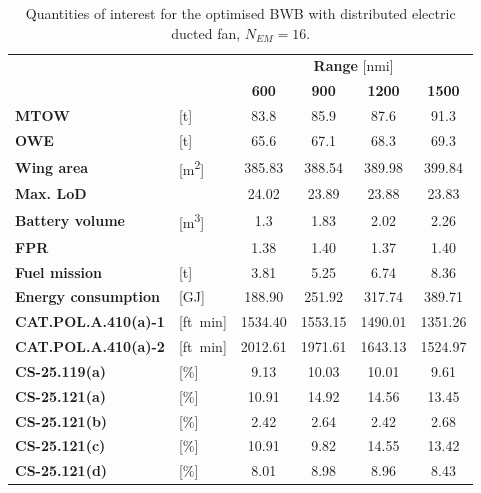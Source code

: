 \begin{table}[!h]
	\centering
	\begin{tabular}{l l c c c c}
		\cline{3-6}
		& & \multicolumn{4}{c}{\textbf{Range} [nmi]} \\
		& & \textbf{600} & \textbf{900} & \textbf{1200} & \textbf{1500} \\
		\hline
		\textbf{MTOW} & [\si{\tonne}] & 83.8 & 85.9 & 87.6 & 91.3 \\
		\textbf{OWE} & [\si{\tonne}] & 65.6 & 67.1 & 68.3 & 69.3 \\
		\textbf{Wing area} & [\si{\square\meter}] & 385.83 & 388.54 & 389.98 & 399.84 \\
		\textbf{Max. LoD} & & 24.02 & 23.89 & 23.88 & 23.83  \\
		\textbf{Battery volume} & [\si{\cubic\meter}] & 1.3 & 1.83 & 2.02 & 2.26 \\
		\textbf{FPR} & & 1.38 & 1.40 & 1.37 & 1.40 \\
		\textbf{Fuel mission} & [\si{\tonne}] & 3.81 & 5.25 & 6.74 & 8.36 \\
		\textbf{Energy consumption} & [\si{\giga\joule}] & 188.90 & 251.92 & 317.74 & 389.71 \\
		\hline
		\textbf{CAT.POL.A.410(a)-1} & [ft\si{\per\minute}] & 1534.40 & 1553.15 & 1490.01 & 1351.26 \\
		\textbf{CAT.POL.A.410(a)-2} & [ft\si{\per\minute}] & 2012.61 & 1971.61 & 1643.13 & 1524.97 \\
		\textbf{CS-25.119(a)} & [\%] & 9.13 & 10.03 & 10.01 & 9.61 \\
		\textbf{CS-25.121(a)} & [\%] & 10.91 & 14.92 & 14.56 & 13.45 \\
		\textbf{CS-25.121(b)} & [\%] & 2.42 & 2.64 & 2.42 & 2.68 \\
		\textbf{CS-25.121(c)} & [\%] & 10.91 & 9.82 & 14.55 & 13.42 \\
		\textbf{CS-25.121(d)} & [\%] & 8.01 & 8.98 & 8.96 & 8.43 \\
		\hline
	\end{tabular}
	\caption{Quantities of interest for the optimised BWB with distributed electric ducted fan, $N_{EM}=16$.}
	\label{tab:bwb_hybrid_dep_optim_res_n16}
\end{table}
